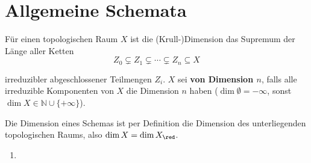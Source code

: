 \section{Allgemeine Schemata}
\begin{defn}[1]
  Für einen topologischen Raum $X$ ist die (Krull-)Dimension das Supremum
  der Länge aller Ketten
  \[
    Z_{0}\subsetneq Z_{1}\subsetneq\cdots\subsetneq Z_{n}\subseteq X
  \]

  irreduzibler abgeschlossener Teilmengen $Z_{i}$. $X$ sei \textbf{von
    Dimension $n$}, falls alle irreduzible Komponenten von $X$ die Dimension
  $n$ haben ($\dim\emptyset=-\infty$, sonst $\dim X\in\mathbb{N}\cup\{+\infty\}$).

  Die Dimension eines Schemas ist per Definition die Dimension des unterliegenden
  topologischen Raums, also $\dim X=\dim X_{\red}$.
\end{defn}

\begin{example}[2]
  \mbox{}
  \begin{enumerate}
  \item 
  \end{enumerate}
\end{example}
